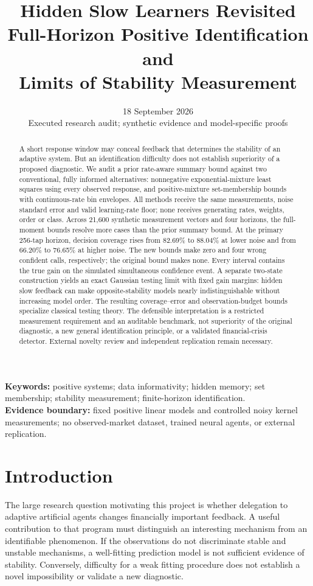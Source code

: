 \documentclass[11pt]{article}
\title{\textbf{Hidden Slow Learners Revisited}\\[5pt]\large Full-Horizon Positive Identification and\\Limits of Stability Measurement}
\author{}
\date{18 September 2026\\[3pt]\small Executed research audit; synthetic evidence and model-specific proofs}
\theoremstyle{remark}\newtheorem{remark}[proposition]{Remark}
\begin{document}
\maketitle
\begin{abstract}
A short response window may conceal feedback that determines the stability of an adaptive system. But an identification difficulty does not establish superiority of a proposed diagnostic. We audit a prior rate-aware summary bound against two conventional, fully informed alternatives: nonnegative exponential-mixture least squares using every observed response, and positive-mixture set-membership bounds with continuous-rate bin envelopes. All methods receive the same measurements, noise standard error and valid learning-rate floor; none receives generating rates, weights, order or class. Across 21,600 synthetic measurement vectors and four horizons, the full-moment bounds resolve more cases than the prior summary bound. At the primary 256-tap horizon, decision coverage rises from 82.69\% to 88.04\% at lower noise and from 66.20\% to 76.65\% at higher noise. The new bounds make zero and four wrong confident calls, respectively; the original bound makes none. Every interval contains the true gain on the simulated simultaneous confidence event. A separate two-state construction yields an exact Gaussian testing limit with fixed gain margins: hidden slow feedback can make opposite-stability models nearly indistinguishable without increasing model order. The resulting coverage--error and observation-budget bounds specialize classical testing theory. The defensible interpretation is a restricted measurement requirement and an auditable benchmark, not superiority of the original diagnostic, a new general identification principle, or a validated financial-crisis detector. External novelty review and independent replication remain necessary.
\end{abstract}
\noindent\textbf{Keywords:} positive systems; data informativity; hidden memory; set membership; stability measurement; finite-horizon identification.\\
\textbf{Evidence boundary:} fixed positive linear models and controlled noisy kernel measurements; no observed-market dataset, trained neural agents, or external replication.

\section{Introduction}
The large research question motivating this project is whether delegation to adaptive artificial agents changes financially important feedback. A useful contribution to that program must distinguish an interesting mechanism from an identifiable phenomenon. If the observations do not discriminate stable and unstable mechanisms, a well-fitting prediction model is not sufficient evidence of stability. Conversely, difficulty for a weak fitting procedure does not establish a novel impossibility or validate a new diagnostic.
\end{document}
